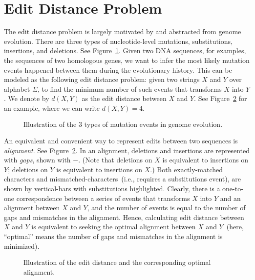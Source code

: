 \setcounter{definition}{0} \setcounter{property}{0} \setcounter{claim}{0} \setcounter{fact}{0} \setcounter{corollary}{0} \setcounter{figure}{0}
\section{Edit Distance Problem}

The edit distance problem is largely motivated by and abstracted from genome evolution.
There are three types of nucleotide-level mutations, substitutions, insertions, and deletions.
See Figure~\ref{fig:edits}. Given two DNA sequences, for examples, the sequences of two homologous genes,
we want to infer the most likely mutation events happened between them during the evolutionary history.
This can be modeled as the following edit distance problem: given two strings $X$ and $Y$ over alphabet $\Sigma$,
to find the minimum number of such events that transforms $X$ into $Y$.
We denote by $d(X, Y)$ as the edit distance between $X$ and $Y$.
See Figure~\ref{fig:align} for an example, where we can write $d(X, Y) = 4$.

\begin{figure}[h]
\centering{}
\caption{Illustration of the 3 types of mutation events in genome evolution.}
\label{fig:edits}
\end{figure}

An equivalent and convenient way to represent edits between two sequences 
is \emph{alignment}. See Figure~\ref{fig:align}.
In an alignment, deletions and insertions are represented with \emph{gaps}, shown with $-$.
(Note that deletions on $X$ is equivalent to insertions on $Y$;
deletions on $Y$ is equivalent to insertions on $X$.)
Both exactly-matched characters and mismatched-characters~(i.e., requires a substitutions event),
are shown by vertical-bars with substitutions highlighted.
Clearly, there is a one-to-one correspondence between a series
of events that transforms $X$ into $Y$ and an alignment between $X$ and $Y$,
and the number of events is equal to the number of gaps and mismatches in the alignment.
Hence, calculating edit distance between $X$ and $Y$ is equivalent to
seeking the optimal alignment between $X$ and $Y$~(here, ``optimal'' means
the number of gaps and mismatches in the alignment is minimized).

\begin{figure}[h]
\centering{}
\caption{Illustration of the edit distance and the corresponding optimal alignment.}
\label{fig:align}
\end{figure}


